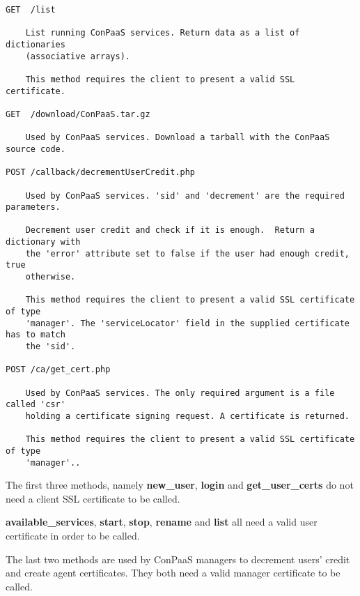 \documentclass[10pt]{article}
\begin{document}
\begin{verbatim}
GET  /list

    List running ConPaaS services. Return data as a list of dictionaries
    (associative arrays).

    This method requires the client to present a valid SSL certificate.

GET  /download/ConPaaS.tar.gz

    Used by ConPaaS services. Download a tarball with the ConPaaS source code.

POST /callback/decrementUserCredit.php
    
    Used by ConPaaS services. 'sid' and 'decrement' are the required parameters.

    Decrement user credit and check if it is enough.  Return a dictionary with
    the 'error' attribute set to false if the user had enough credit, true
    otherwise.

    This method requires the client to present a valid SSL certificate of type
    'manager'. The 'serviceLocator' field in the supplied certificate has to match
    the 'sid'.

POST /ca/get_cert.php

    Used by ConPaaS services. The only required argument is a file called 'csr'
    holding a certificate signing request. A certificate is returned.

    This method requires the client to present a valid SSL certificate of type
    'manager'..
\end{verbatim}

The first three methods, namely \textbf{new\_user}, \textbf{login} and
\textbf{get\_user\_certs} do not need a client SSL certificate to be called.

\textbf{available\_services}, \textbf{start}, \textbf{stop}, \textbf{rename}
and \textbf{list} all need a valid user certificate in order to be called.

The last two methods are used by ConPaaS managers to decrement users' credit
and create agent certificates. They both need a valid manager certificate to be
called.
\end{document}
